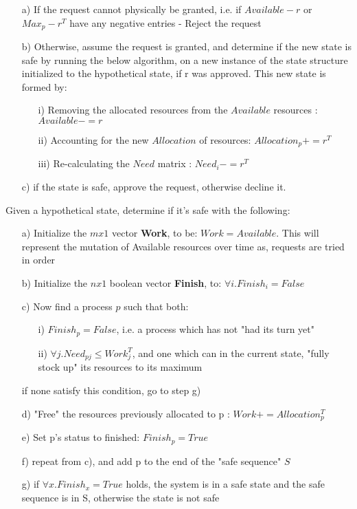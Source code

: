 \documentclass{article}
\begin{document}
{    \begin{itemize}
        \item[a)] If the request cannot physically be granted, i.e. if $Available - r$ or $Max_{p} - r^{T}$ have any negative entries - Reject the request
        \item[b)] Otherwise, assume the request is granted, and determine if the new state is safe by running the below algorithm, on a new instance of the state structure initialized to the hypothetical state, if r was approved. This new state is formed by:
            \begin{itemize}
                \item[i)] Removing the allocated resources from the $Available$ resources : $Available -= r$
                \item[ii)] Accounting for the new $Allocation$ of resources: $Allocation_{p} += r^{T}$ 
                \item[iii)] Re-calculating the $Need$ matrix : $Need_{i} -= r^{T}$ 
            \end{itemize} 
        \item[c)] if the state is safe, approve the request, otherwise decline it.    
    \end{itemize}

    Given a hypothetical state, determine if it's safe with the following:
    \begin{itemize}
        \item[a)] Initialize the $m x 1$ vector \textbf{Work}, to be: $Work = Available$. This will represent the mutation of Available resources over time as, requests are tried in order
        \item[b)] Initialize the $n x 1$ boolean vector \textbf{Finish}, to: $\forall i. Finish_{i} = False $ 
        \item[c)] Now find a process $p$ such that both:
            \begin{itemize}
                \item[i)] $Finish_{p} = False$, i.e. a process which has not "had its turn yet"
                \item[ii)] $\forall j. Need_{pj} \leq Work^{T}_{j}$, and one which can in the current state, "fully stock up" its resources to its maximum 
            \end{itemize}    
                if none satisfy this condition, go to step g)
        \item[d)] "Free" the resources previously allocated to p : $Work += Allocation_{p}^{T}$
        \item[e)] Set p's status to finished: $Finish_{p} = True$
        \item[f)] repeat from c), and add p to the end of the "safe sequence" $S$ 
        \item[g)] if $\forall x. Finish_{x} = True$ holds, the system is in a safe state and the safe sequence is in S, otherwise the state is not safe 
    \end{itemize}
}
\end{document}
